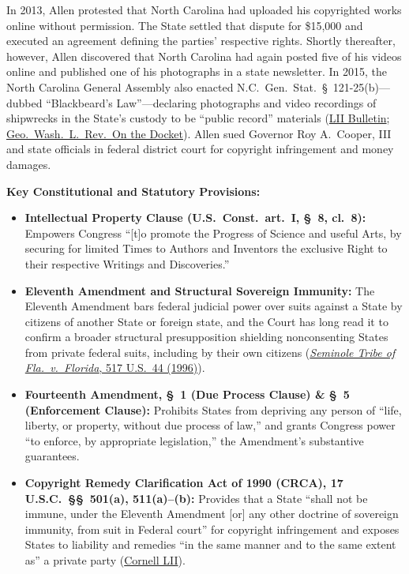 \documentclass[12pt]{article}
\begin{document}
In 2013, Allen protested that North Carolina had uploaded his copyrighted works online without permission. The State settled that dispute for \$15,000 and executed an agreement defining the parties' respective rights. Shortly thereafter, however, Allen discovered that North Carolina had again posted five of his videos online and published one of his photographs in a state newsletter. In 2015, the North Carolina General Assembly also enacted N.C.\ Gen.\ Stat.\ \S~121-25(b)---dubbed ``Blackbeard's Law''---declaring photographs and video recordings of shipwrecks in the State's custody to be ``public record'' materials (\href{https://www.law.cornell.edu/supct/cert/18-877}{LII Bulletin}; \href{https://www.gwlr.org/allen-v-cooper-states-stay-copyright-pirates/}{Geo.\ Wash.\ L.\ Rev.\ On the Docket}). Allen sued Governor Roy A.\ Cooper, III and state officials in federal district court for copyright infringement and money damages.

\textbf{Key Constitutional and Statutory Provisions:}
\begin{itemize}
  \item \textbf{Intellectual Property Clause (U.S.\ Const.\ art.\ I, \S~8, cl.\ 8):} Empowers Congress ``[t]o promote the Progress of Science and useful Arts, by securing for limited Times to Authors and Inventors the exclusive Right to their respective Writings and Discoveries.''
  \item \textbf{Eleventh Amendment and Structural Sovereign Immunity:} The Eleventh Amendment bars federal judicial power over suits against a State by citizens of another State or foreign state, and the Court has long read it to confirm a broader structural presupposition shielding nonconsenting States from private federal suits, including by their own citizens (\href{https://supreme.justia.com/cases/federal/us/517/44/}{\textit{Seminole Tribe of Fla.\ v.\ Florida}, 517 U.S.\ 44 (1996)}).
  \item \textbf{Fourteenth Amendment, \S~1 (Due Process Clause) \& \S~5 (Enforcement Clause):} Prohibits States from depriving any person of ``life, liberty, or property, without due process of law,'' and grants Congress power ``to enforce, by appropriate legislation,'' the Amendment's substantive guarantees.
  \item \textbf{Copyright Remedy Clarification Act of 1990 (CRCA), 17 U.S.C.\ \S\S~501(a), 511(a)--(b):} Provides that a State ``shall not be immune, under the Eleventh Amendment [or] any other doctrine of sovereign immunity, from suit in Federal court'' for copyright infringement and exposes States to liability and remedies ``in the same manner and to the same extent as'' a private party (\href{https://www.law.cornell.edu/supremecourt/text/18-877}{Cornell LII}).
\end{itemize}
\end{document}
